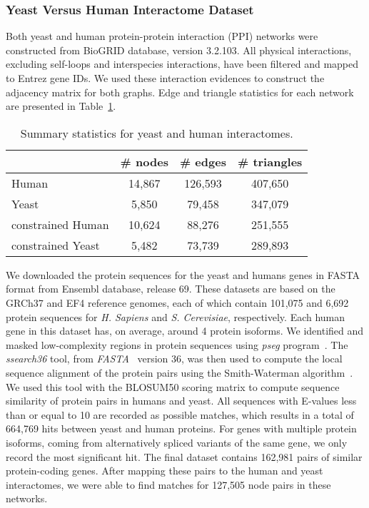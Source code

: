 \documentclass[10pt, journal, compsoc, final]{IEEEtran}
\begin{document}
\subsubsection{Yeast Versus Human Interactome Dataset}
\label{sec:SeqSim}

Both yeast and human protein-protein 
interaction (PPI) networks were constructed from BioGRID database, version 3.2.103. All physical 
interactions, excluding self-loops and interspecies interactions, have been filtered and mapped to 
Entrez gene IDs. We used these interaction evidences to construct the adjacency matrix for both 
graphs. Edge and triangle  statistics for each network are presented in 
Table~\ref{table:netStats}.

\begin{table}[!t]
\caption{Summary statistics for yeast and human interactomes.}
\label{table:netStats}
\centering
\begin{tabular}{lccc}
\toprule
	&\# nodes	&\# edges	&\# triangles\\	\midrule
Human	&14,867	&126,593	&407,650\\
Yeast	&5,850	&79,458	&347,079\\ 
\addlinespace
constrained Human & 10,624 & 88,276 & 251,555\\
constrained Yeast & 5,482 & 73,739 & 289,893 \\
\bottomrule
\end{tabular}
\end{table}

We downloaded the protein sequences for the yeast and 
humans genes in FASTA format from Ensembl database, release 69. These datasets are based on the GRCh37 
and EF4 reference genomes, each of which contain 101,075 and 6,692 protein sequences for 
\textit{H. Sapiens} and \textit{S. Cerevisiae}, respectively. Each human gene in this dataset has, 
on average, around 4 protein isoforms. We identified and masked low-complexity regions in protein 
sequences using \textit{pseg} program~\cite{PSEG}. The \textit{ssearch36} tool, from 
\textit{FASTA}~\cite{FASTA} version 36, was then used to compute the local sequence alignment of 
the protein pairs using the Smith-Waterman algorithm~\cite{Smith1981}. We used this tool with the 
BLOSUM50 scoring matrix to compute sequence similarity of protein pairs in humans and yeast. All 
sequences with E-values less than or equal to 10 are recorded as possible matches, which results 
in a total of 664,769 hits between yeast and human proteins. For genes with multiple protein 
isoforms, coming from alternatively spliced variants of the same gene, we only record the most 
significant hit. The final dataset contains 162,981 pairs of similar protein-coding genes. After 
mapping these pairs to the human and yeast interactomes, we were able to find matches for 127,505 
node pairs in these networks. 
\end{document}
